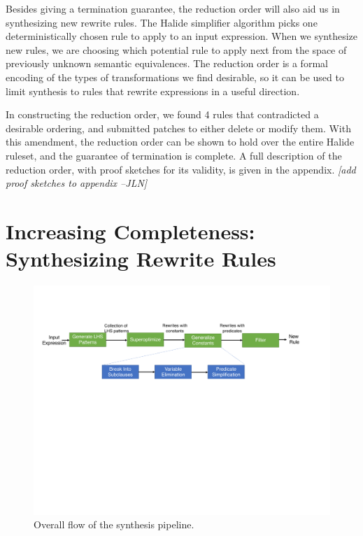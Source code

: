 \documentclass[acmsmall,review,anonymous]{acmart}\settopmatter{printfolios=true,printccs=false,printacmref=false}
\newcommand{\jln}[1]{\textcolor{uwpurple}{\textit{[{#1} --JLN]}}}
\begin{document}
Besides giving a termination guarantee, the reduction order will also aid us in synthesizing new rewrite rules. The Halide simplifier algorithm picks one deterministically chosen rule to apply to an input expression. When we synthesize new rules, we are choosing which potential rule to apply next from the space of previously unknown semantic equivalences. The reduction order is a formal encoding of the types of transformations we find desirable, so it can be used to limit synthesis to rules that rewrite expressions in a useful direction.

In constructing the reduction order, we found 4 rules that contradicted a desirable ordering, and submitted patches to either delete or modify them. With this amendment, the reduction order can be shown to hold over the entire Halide ruleset, and the guarantee of termination is complete. A full description of the reduction order, with proof sketches for its validity, is given in the appendix. \jln{add proof sketches to appendix}

\section{Increasing Completeness: Synthesizing Rewrite Rules}
\begin{figure}
\includegraphics[width=1.\columnwidth]{figures/synthesis-flow.pdf}
\caption{Overall flow of the synthesis pipeline.}
\label{fig:synthesis-flow}
\end{figure}
\end{document}
